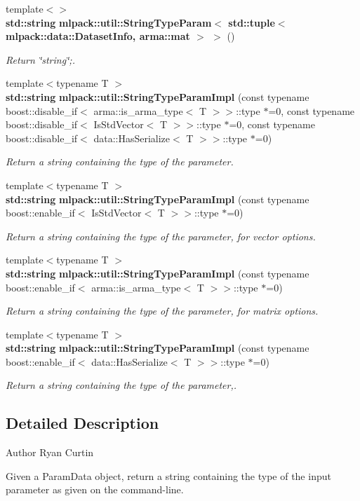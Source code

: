 \begin{DoxyCompactItemize}
{\footnotesize template$<$$>$ }\\{\bf std\+::string} {\bf mlpack\+::util\+::\+String\+Type\+Param$<$ std\+::tuple$<$ mlpack\+::data\+::\+Dataset\+Info, arma\+::mat $>$ $>$} ()
\begin{DoxyCompactList}\small\item\em Return \char`\"{}string\char`\"{};. \end{DoxyCompactList}\item 
{\footnotesize template$<$typename T $>$ }\\{\bf std\+::string} {\bf mlpack\+::util\+::\+String\+Type\+Param\+Impl} (const typename boost\+::disable\+\_\+if$<$ arma\+::is\+\_\+arma\+\_\+type$<$ T $>$$>$\+::type $\ast$=0, const typename boost\+::disable\+\_\+if$<$ Is\+Std\+Vector$<$ T $>$$>$\+::type $\ast$=0, const typename boost\+::disable\+\_\+if$<$ data\+::\+Has\+Serialize$<$ T $>$$>$\+::type $\ast$=0)
\begin{DoxyCompactList}\small\item\em Return a string containing the type of the parameter. \end{DoxyCompactList}\item 
{\footnotesize template$<$typename T $>$ }\\{\bf std\+::string} {\bf mlpack\+::util\+::\+String\+Type\+Param\+Impl} (const typename boost\+::enable\+\_\+if$<$ Is\+Std\+Vector$<$ T $>$$>$\+::type $\ast$=0)
\begin{DoxyCompactList}\small\item\em Return a string containing the type of the parameter, for vector options. \end{DoxyCompactList}\item 
{\footnotesize template$<$typename T $>$ }\\{\bf std\+::string} {\bf mlpack\+::util\+::\+String\+Type\+Param\+Impl} (const typename boost\+::enable\+\_\+if$<$ arma\+::is\+\_\+arma\+\_\+type$<$ T $>$$>$\+::type $\ast$=0)
\begin{DoxyCompactList}\small\item\em Return a string containing the type of the parameter, for matrix options. \end{DoxyCompactList}\item 
{\footnotesize template$<$typename T $>$ }\\{\bf std\+::string} {\bf mlpack\+::util\+::\+String\+Type\+Param\+Impl} (const typename boost\+::enable\+\_\+if$<$ data\+::\+Has\+Serialize$<$ T $>$$>$\+::type $\ast$=0)
\begin{DoxyCompactList}\small\item\em Return a string containing the type of the parameter,. \end{DoxyCompactList}\end{DoxyCompactItemize}


\subsection{Detailed Description}
\begin{DoxyAuthor}{Author}
Ryan Curtin
\end{DoxyAuthor}
Given a Param\+Data object, return a string containing the type of the input parameter as given on the command-\/line. 